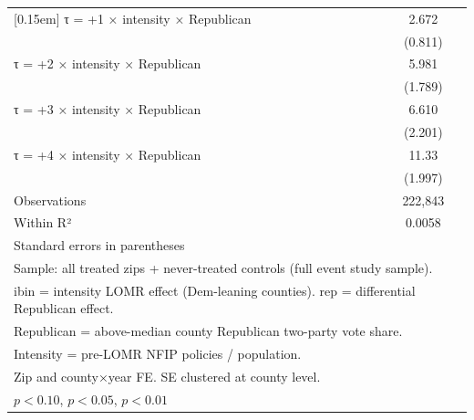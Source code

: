 \begin{table}[htbp]
\begin{tabular}{l*{1}{c}}
[0.15em]
τ = +1 × intensity × Republican&       2.672\sym{***}\\
                    &     (0.811)         \\
[0.15em]
τ = +2 × intensity × Republican&       5.981\sym{***}\\
                    &     (1.789)         \\
[0.15em]
τ = +3 × intensity × Republican&       6.610\sym{***}\\
                    &     (2.201)         \\
[0.15em]
τ = +4 × intensity × Republican&       11.33\sym{***}\\
                    &     (1.997)         \\
\hline
Observations        &     222,843         \\
Within R²           &      0.0058         \\
\hline\hline
\multicolumn{2}{l}{\footnotesize Standard errors in parentheses}\\
\multicolumn{2}{l}{\footnotesize Sample: all treated zips + never-treated controls (full event study sample).}\\
\multicolumn{2}{l}{\footnotesize ibin = intensity LOMR effect (Dem-leaning counties). rep = differential Republican effect.}\\
\multicolumn{2}{l}{\footnotesize Republican = above-median county Republican two-party vote share.}\\
\multicolumn{2}{l}{\footnotesize Intensity = pre-LOMR NFIP policies / population.}\\
\multicolumn{2}{l}{\footnotesize Zip and county×year FE. SE clustered at county level.}\\
\multicolumn{2}{l}{\footnotesize \sym{*} \(p<0.10\), \sym{**} \(p<0.05\), \sym{***} \(p<0.01\)}\\
\end{tabular}
\end{table}
